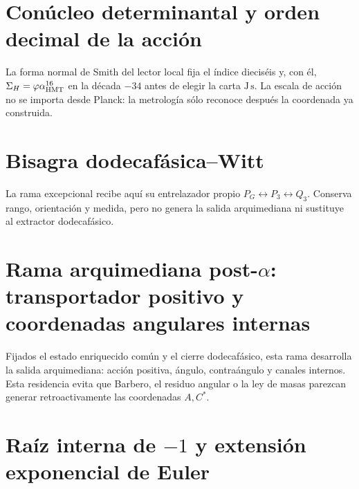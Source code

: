 \chapter{Conúcleo determinantal y orden decimal de la acción}
\label{chap:escala-accion-rev7}
La forma normal de Smith del lector local fija el índice dieciséis y, con él,
\(\Sigma_H=\varphi\alpha_{\rm HMT}^{16}\) en la década \(-34\) antes de
elegir la carta \(\mathrm{J\,s}\). La escala de acción no se importa desde
Planck: la metrología sólo reconoce después la coordenada ya construida.
\HMTDemoteHeadings

\HMTRestoreHeadings

\chapter{Bisagra dodecafásica--Witt}
\label{chap:entrelazador-dodecafase-witt-rev8}
La rama excepcional recibe aquí su entrelazador propio
\(P_G\leftrightarrow P_3\leftrightarrow Q_3\). Conserva rango,
orientación y medida, pero no genera la salida arquimediana ni sustituye al
extractor dodecafásico.
\HMTDemoteHeadings

\HMTRestoreHeadings

\chapter[Rama arquimediana post-\texorpdfstring{\(\alpha\)}{alpha}]{Rama
arquimediana post-\texorpdfstring{\(\alpha\)}{alpha}: transportador positivo
y coordenadas angulares internas}
\label{chap:entrelazador-angular-rev8}
Fijados el estado enriquecido común y el cierre dodecafásico, esta rama
desarrolla la salida arquimediana: acción positiva, ángulo, contraángulo y
canales internos. Esta residencia evita que Barbero, el residuo angular o la
ley de masas parezcan generar retroactivamente las coordenadas \(A,C^*\).
\HMTDemoteHeadings





\HMTRestoreHeadings

\chapter{Raíz interna de \texorpdfstring{\(-1\)}{-1} y extensión
exponencial de Euler}
\label{chap:raiz-euler-rev7}
\HMTDemoteHeadings


\HMTRestoreHeadings

